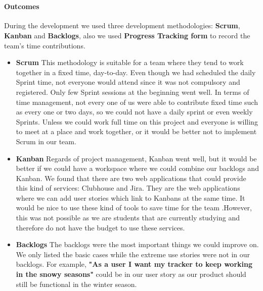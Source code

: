 \documentclass[12pt,a4paper]{article}
\begin{document}
        \paragraph{Outcomes}During the development we used three development methodologies: {\bf Scrum}, {\bf Kanban} and {\bf Backlogs}, also we used {\bf Progress Tracking form} to record the team's time contributions.

        \begin{itemize}
          \item {\bf Scrum} This methodology is suitable for a team where they tend to work together in a fixed time, day-to-day. Even though we had scheduled the daily Sprint time, not everyone would attend since it was not compulsory and registered. Only few Sprint sessions at the beginning went well. In terms of time management, not every one of us were able to contribute fixed time such as every one or two days, so we could not have a daily sprint or even weekly Sprints. Unless we could work full time on this project and everyone is willing to meet at a place and work together, or it would be better not to implement Scrum in our team. 
          
          \item {\bf Kanban} Regards of project management, Kanban went well, but it would be better if we could have a workspace where we could combine our backlogs and Kanban. We found that there are two web applications that could provide this kind of services: Clubhouse and Jira. They are the web applications where we can add user stories which link to Kanbans at the same time. It would be nice to use these kind of tools to save time for the team .However, this was not possible as we are students that are currently studying and therefore do not have the budget to use these services.
        
          \item {\bf Backlogs} The backlogs were the most important things we could improve on. We only listed the basic cases while the extreme use stories were not in our backlogs. For example, {\bf "As a user I want my tracker to keep working in the snowy seasons"} could be in our user story as our product should still be functional in the winter season.


\end{itemize}
\end{document}
